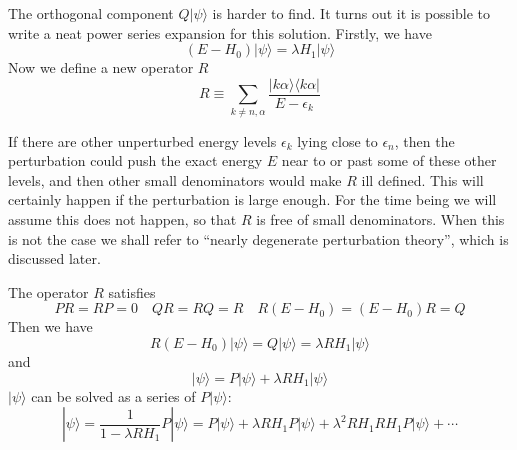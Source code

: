 The orthogonal component $Q|\psi\rangle$ is harder to find. It turns out it is possible to write a neat power series expansion for this solution. Firstly, we have
\[(E-H_0)|\psi\rangle = \lambda H_1 |\psi\rangle\]
Now we define a new operator $R$
\[R \equiv \sum_{k \neq n,\alpha} \frac{|k\alpha\rangle \langle k\alpha|}{E-\epsilon_k}\]
\begin{note}
If there are other unperturbed energy levels $\epsilon_k$ lying close to $\epsilon_n$, then the perturbation could push
the exact energy $E$ near to or past some of these other levels, and then other small denominators would make $R$ ill defined.
This will certainly happen if the perturbation is large enough. For the time being we will assume this does not happen, so that $R$ is free of small denominators. When this is not the case we shall refer to ``nearly degenerate perturbation theory'', which is discussed later.
\end{note}
\noindent
The operator $R$ satisfies
\[PR=RP=0 \quad QR=RQ=R \quad R(E-H_0) = (E-H_0)R = Q\]
Then we have
\[R(E-H_0)|\psi\rangle = Q|\psi\rangle = \lambda RH_1 |\psi\rangle\]
and
\[|\psi\rangle = P|\psi\rangle + \lambda R H_1 |\psi\rangle\]
$|\psi\rangle$ can be solved as a series of $P|\psi\rangle$:
\[|\psi\rangle = \frac{1}{1-\lambda RH_1} P|\psi\rangle = P|\psi\rangle + \lambda RH_1P|\psi\rangle + \lambda^2 RH_1RH_1 P|\psi\rangle + \cdots\]

